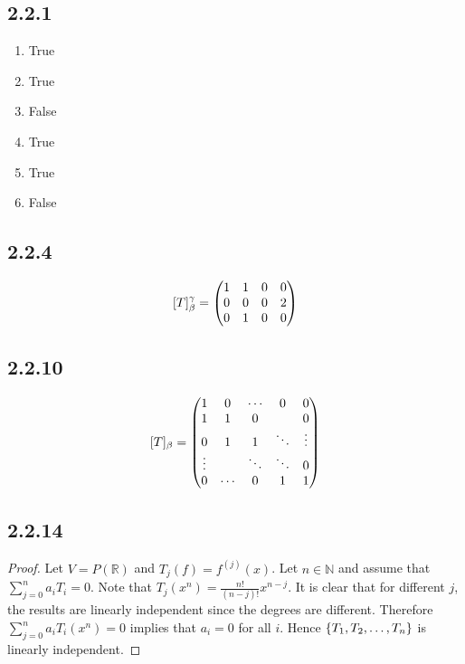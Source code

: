 \documentclass[12pt,titlepage]{extarticle}
\begin{document}
\subsection*{2.2.1}
\begin{enumerate}[label=\alph*)]
    \item True
    \item True
    \item False
    \item True
    \item True
    \item False
\end{enumerate}

\subsection*{2.2.4}
\[
    [T]_\beta^\gamma = \mqty(
    1 & 1 & 0 & 0 \\
    0 & 0 & 0 & 2 \\
    0 & 1 & 0 & 0
    )
\]

\subsection*{2.2.10}
\[
    [T]_\beta = \mqty(
    1 & 0 & \cdots & 0 & 0\\
    1 & 1 & 0 &   & 0\\
    0 & 1 & 1 & \ddots & \vdots\\
    \vdots &   & \ddots & \ddots & 0\\
    0 & \cdots & 0 & 1 & 1\\
    )
\]

\subsection*{2.2.14}
\begin{proof}
    Let $V = P(\mathbb{R})$ and $T_j(f) = f^{(j)}(x)$. Let $n\in \mathbb{N}$ and assume that $\sum_{j=0}^{n} a_i T_i = 0$. Note that $T_j(x^n) = \frac{n!}{(n-j)!} x^{n-j}$. It is clear that for different $j$, the results are linearly independent since the degrees are different. Therefore $\sum_{j=0}^{n} a_i T_i(x^n) = 0$ implies that $a_i = 0$ for all $i$. Hence $\qty{T_1, T_2, \ldots, T_n}$ is linearly independent. 
\end{proof}
\end{document}

